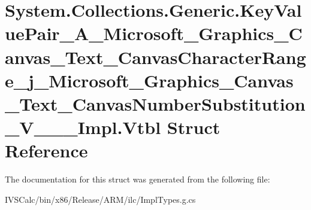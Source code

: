 \hypertarget{struct_system_1_1_collections_1_1_generic_1_1_key_value_pair___a___microsoft___graphics___canvas1c09a50e6bbc2cd9260b1f53bea84c43}{}\section{System.\+Collections.\+Generic.\+Key\+Value\+Pair\+\_\+\+A\+\_\+\+Microsoft\+\_\+\+Graphics\+\_\+\+Canvas\+\_\+\+Text\+\_\+\+Canvas\+Character\+Range\+\_\+j\+\_\+\+Microsoft\+\_\+\+Graphics\+\_\+\+Canvas\+\_\+\+Text\+\_\+\+Canvas\+Number\+Substitution\+\_\+\+V\+\_\+\+\_\+\+\_\+\+Impl.\+Vtbl Struct Reference}
\label{struct_system_1_1_collections_1_1_generic_1_1_key_value_pair___a___microsoft___graphics___canvas1c09a50e6bbc2cd9260b1f53bea84c43}


The documentation for this struct was generated from the following file\+:\begin{DoxyCompactItemize}
\item 
I\+V\+S\+Calc/bin/x86/\+Release/\+A\+R\+M/ilc/Impl\+Types.\+g.\+cs\end{DoxyCompactItemize}
